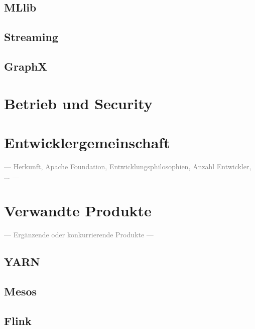 \subsection{MLlib}
\subsection{Streaming}
\subsection{GraphX}

\section{Betrieb und Security}

\section{Entwicklergemeinschaft}
\textcolor{gray}{--- Herkunft, Apache Foundation, Entwicklungsphilosophien, Anzahl Entwickler, ... ---}\\

\section{Verwandte Produkte}
\textcolor{gray}{--- Ergänzende oder konkurrierende Produkte ---}\\
\subsection{YARN}
\subsection{Mesos}
\subsection{Flink}
